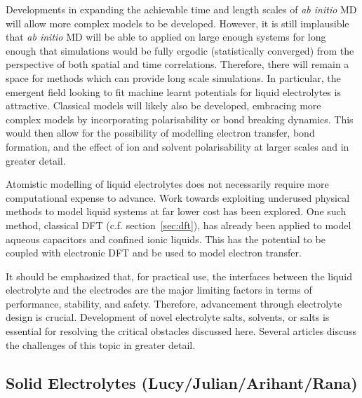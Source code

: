 \documentclass[../main.tex]{subfiles}
\begin{document}
Developments in expanding the achievable time and length scales of \textit{ab initio} MD will allow more complex models to be developed. However, it is still implausible that \textit{ab initio} MD will be able to applied on large enough systems for long enough that simulations would be fully ergodic (statistically converged) from the perspective of both spatial and time correlations. Therefore, there will remain a space for methods which can provide long scale simulations. In particular, the emergent field looking to fit machine learnt potentials for liquid electrolytes is attractive\cite{shao2021modelling, hellstrom2016concentration, tovey2020dft}. Classical models will likely also be developed, embracing more complex models by incorporating polarisability\cite{marin-lafleche_metalwalls_2020,schroder_polarizable_2020} or bond breaking dynamics\cite{fedkin2019development,hossain2020lithium}. This would then allow for the possibility of modelling electron transfer, bond formation, and the effect of ion and solvent polarisability at larger scales and in greater detail.
    
Atomistic modelling of liquid electrolytes does not necessarily require more computational expense to advance. Work towards exploiting underused physical methods to model liquid systems at far lower cost has been explored. One such method, classical DFT (c.f. section~\ref{sec:dft}), has already been applied to model aqueous capacitors\cite{jeanmairet2019study} and confined ionic liquids\cite{forsman_classical_2011}. This has the potential to be coupled with electronic DFT\cite{jeanmairet2019study} and be used to model electron transfer\cite{jeanmairet2019molecular}.

It should be emphasized that, for practical use, the interfaces between the liquid electrolyte and the electrodes are the major limiting factors in terms of performance, stability, and safety. Therefore, advancement through electrolyte design is crucial. Development of novel electrolyte salts, solvents, or salts is essential for resolving the critical obstacles discussed here. Several articles discuss the challenges of this topic in greater detail. \cite{jie2020advanced,francis2020lithium,xiong2018toward}

\subsection{Solid Electrolytes (Lucy/Julian/Arihant/Rana)}
\label{sec:solid_electrolytes}
\end{document}
